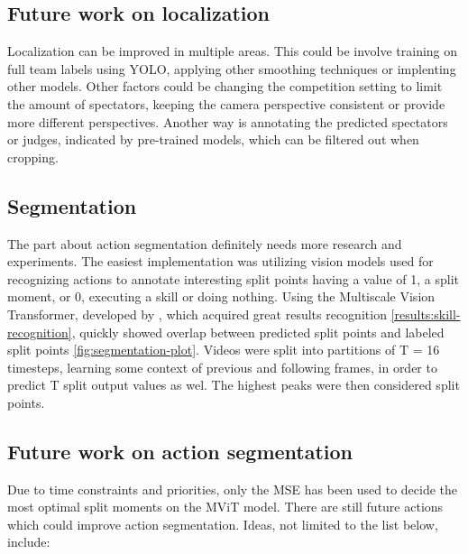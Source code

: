 \subsection{Future work on localization}

Localization can be improved in multiple areas. This could be involve training on full team labels using YOLO, applying other smoothing techniques or implenting other models. Other factors could be changing the competition setting to limit the amount of spectators, keeping the camera perspective consistent or provide more different perspectives. Another way is annotating the predicted spectators or judges, indicated by pre-trained models, which can be filtered out when cropping.

\subsection{Segmentation}

The part about action segmentation definitely needs more research and experiments. The easiest implementation was utilizing vision models used for recognizing actions to annotate interesting split points having a value of 1, a split moment, or 0, executing a skill or doing nothing. Using the Multiscale Vision Transformer, developed by \autocite{Fan2021}, which acquired great results recognition \ref{results:skill-recognition}, quickly showed overlap between predicted split points and labeled split points \ref{fig:segmentation-plot}.
Videos were split into partitions of T = 16 timesteps, learning some context of previous and following frames, in order to predict T split output values as wel. The highest peaks were then considered split points.

\subsection{Future work on action segmentation}

Due to time constraints and priorities, only the MSE has been used to decide the most optimal split moments on the MViT model. There are still future actions which could improve action segmentation. Ideas, not limited to the list below, include:

